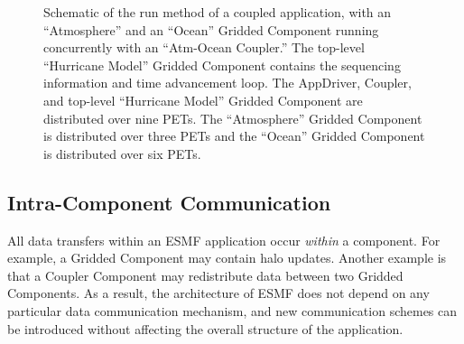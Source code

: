 \begin{center}
\begin{figure}
\caption{Schematic of the run method of a coupled application, with an
``Atmosphere'' and an ``Ocean'' Gridded Component running concurrently with 
an ``Atm-Ocean Coupler.''  The top-level ``Hurricane Model'' 
Gridded Component contains the sequencing information and time 
advancement loop.  The AppDriver, Coupler, and top-level ``Hurricane
Model'' Gridded Component are distributed over nine PETs.  The
``Atmosphere'' Gridded Component is distributed over three PETs and
the ``Ocean'' Gridded Component is distributed over six PETs.}
\label{fig:concurrent}
\end{figure}
\end{center}

\subsection{Intra-Component Communication}
\label{sec:localcomm}

All data transfers within an ESMF application occur {\it within} a
component.  For example, a Gridded Component may contain halo updates.
Another example is that a Coupler Component may redistribute
data between two Gridded Components.  As a result,
the architecture of ESMF does not depend on any particular data
communication mechanism, and new communication schemes can be
introduced without affecting the overall structure of the application.

